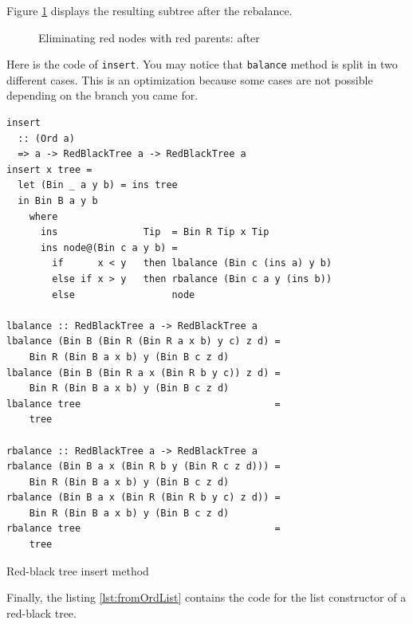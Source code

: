 \documentclass[12pt, a4paper]{article} %
\newcommand{\code}[1]{\texttt{#1}} %
\begin{document}
Figure \ref{fig:rebalance} displays the resulting subtree after the rebalance.

\begin{figure}
\centering
\caption{Eliminating red nodes with red parents: after} \label{fig:rebalance}
\end{figure}

Here is the code of \code{insert}. You may notice that \code{balance} method is split in two different cases. This is an optimization because some cases are not possible depending on the branch you came for.

\begin{listing}[H]
  \begin{verbatim}
insert
  :: (Ord a)
  => a -> RedBlackTree a -> RedBlackTree a
insert x tree =
  let (Bin _ a y b) = ins tree
  in Bin B a y b
    where
      ins               Tip  = Bin R Tip x Tip
      ins node@(Bin c a y b) =
        if      x < y   then lbalance (Bin c (ins a) y b)
        else if x > y   then rbalance (Bin c a y (ins b))
        else                 node

lbalance :: RedBlackTree a -> RedBlackTree a
lbalance (Bin B (Bin R (Bin R a x b) y c) z d) =
    Bin R (Bin B a x b) y (Bin B c z d)
lbalance (Bin B (Bin R a x (Bin R b y c)) z d) =
    Bin R (Bin B a x b) y (Bin B c z d)
lbalance tree                                  =
    tree

rbalance :: RedBlackTree a -> RedBlackTree a
rbalance (Bin B a x (Bin R b y (Bin R c z d))) =
    Bin R (Bin B a x b) y (Bin B c z d)
rbalance (Bin B a x (Bin R (Bin R b y c) z d)) =
    Bin R (Bin B a x b) y (Bin B c z d)
rbalance tree                                  =
    tree
  \end{verbatim}
  \caption{Red-black tree insert method}
  \label{lst:insert}
\end{listing}

Finally, the listing \ref{lst:fromOrdList} contains the code for the list constructor of a red-black tree.
\end{document}
